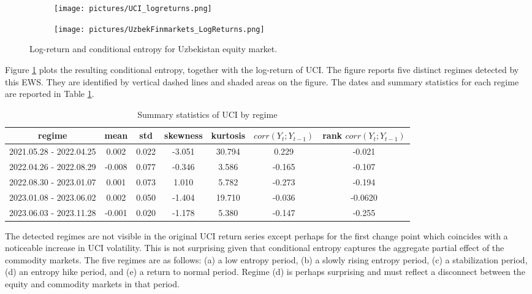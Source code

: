 \begin{figure}[H]
     \begin{subfigure}[b]{\textwidth}
         \centering
     \texttt{[image: pictures/UCI\_logreturns.png]}
     \end{subfigure}
     \vfill
     \begin{subfigure}[b]{\textwidth}
         \centering
 \texttt{[image: pictures/UzbekFinmarkets\_LogReturns.png]}    
     \end{subfigure}
     \caption{Log-return and conditional entropy for Uzbekistan equity market.}\label{fig:uzb}
\end{figure}


Figure \ref{fig:uzb} plots the resulting conditional entropy, together with the log-return of UCI. The figure reports five distinct regimes detected by this EWS. They are identified by vertical dashed lines and shaded areas on the figure. The dates and summary statistics for each regime are reported in Table \ref{tab:regimes_UZB}. 

\begin{table}[H]
    \centering
    \begin{tabular}{c|cccccc} 
         regime& mean& std&  skewness&  kurtosis&  $corr(Y_t; Y_{t-1})$& rank $corr(Y_t; Y_{t-1})$\\ \hline 
         2021.05.28 - 2022.04.25& 0.002& 0.022&  -3.051&  30.794&  0.229& -0.021\\  
         2022.04.26 - 2022.08.29& -0.008& 0.077&  -0.346&  3.586&  -0.165& -0.107\\ 
         2022.08.30 - 2023.01.07& 0.001& 0.073&  1.010&  5.782&  -0.273& -0.194\\ 
         2023.01.08 - 2023.06.02& 0.002& 0.050&  -1.404&  19.710&  -0.036& -0.0620\\ 
 2023.06.03 - 2023.11.28& -0.001& 0.020& -1.178& 5.380& -0.147&-0.255\\\hline
    \end{tabular}
    \caption{Summary statistics of UCI by regime}\label{tab:regimes_UZB}
\end{table}

The detected regimes are not visible in the original UCI return series except perhaps for the first change point which coincides with a noticeable increase in UCI volatility. This is not surprising given that conditional entropy captures the aggregate partial effect of the commodity markets. The five regimes are as follows: (a) a low entropy period, (b) a slowly rising entropy period, (c) a stabilization period, (d) an entropy hike period, and (e) a return to normal period. Regime (d) is perhaps surprising and must reflect a disconnect between the equity and commodity markets in that period. 
